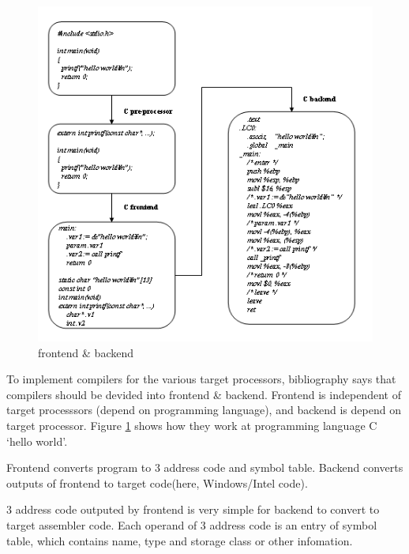 \begin{figure}[htbp]
\begin{center}
\begin{htmlonly}
\includegraphics[width=1.2\linewidth,height=1.2\linewidth]{front_back_e.png}
\end{htmlonly}
\caption{frontend \& backend}
\label{front_back_e007}
\end{center}
\end{figure}

To implement compilers for the various target processors, 
bibliography \cite{doragon} says that compilers should be devided into
 frontend \& backend.
Frontend is independent of target processsors
(depend on programming language), and backend is depend on
target processor. Figure \ref{front_back_e007} shows how they work
at programming language C `hello world'.

Frontend converts program to 3 address code and symbol table.
Backend converts outputs of frontend to target code(here, Windows/Intel code).

3 address code outputed by frontend is very simple for backend to
convert to target assembler code. Each operand of 3 address code
is an entry of symbol table, which contains name, type and storage class
or other infomation.

